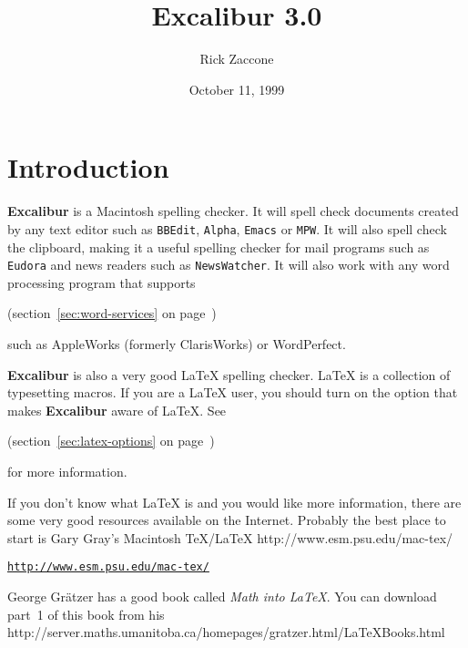 \documentclass[11pt,titlepage]{article}
\newcommand{\ex}{\textbf{Excalibur}}
\begin{document}
\title{Excalibur 3.0}
\author{Rick Zaccone}
\date{October 11, 1999}
\tableofcontents
\newpage
{}
\maketitle
\sloppy

\section{Introduction}

\ex{} is a Macintosh spelling checker.  It will spell check documents
created by any text editor such as \texttt{BBEdit}, \texttt{Alpha},
\texttt{Emacs} or \texttt{MPW}.  It will also spell check the
clipboard, making it a useful spelling checker for mail programs such
as \texttt{Eudora} and news readers such as \texttt{NewsWatcher}.  It
will also work with any word processing program that supports
\begin{latexonly}
  (section~\ref{sec:word-services} on
  page~\pageref{sec:word-services})
\end{latexonly}
such as AppleWorks (formerly ClarisWorks) or WordPerfect.

\ex{} is also a very good \LaTeX{} spelling checker.  \LaTeX{} is a
collection of typesetting macros.  If you are a \LaTeX{} user, you
should turn on the option that makes \ex{} aware of \LaTeX.  See
\begin{latexonly}
  (section~\ref{sec:latex-options} on
  page~\pageref{sec:latex-options})
\end{latexonly}
for more information.

If you don't know what \LaTeX{} is and you would like more
information, there are some very good resources available on the
Internet.  Probably the best place to start is Gary Gray's
Macintosh \TeX/\LaTeX{} 
{http://www.esm.psu.edu/mac-tex/}
\begin{latexonly}
\begin{alltt}
\url{http://www.esm.psu.edu/mac-tex/}
\end{alltt}
\end{latexonly}

George Gr\"{a}tzer has a good book called \emph{Math into \LaTeX}.
You can download part~1 of this book from his 
{http://server.maths.umanitoba.ca/homepages/gratzer.html/LaTeXBooks.html}
\end{document}
